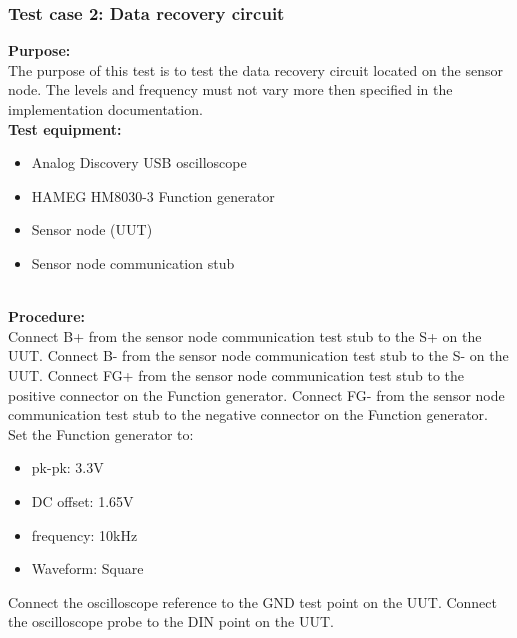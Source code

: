 \subsubsection{Test case 2: Data recovery circuit}
\textbf{Purpose:}\\
The purpose of this test is to test the data recovery circuit located on the sensor node.  The levels and frequency must not vary more then specified in the implementation documentation.\\

\textbf{Test equipment:}
\begin{itemize}
	\item Analog Discovery USB oscilloscope
	\item HAMEG HM8030-3 Function generator
	\item Sensor node (UUT)
	\item Sensor node communication stub
\end{itemize}
\ \\
\textbf{Procedure:}\\
Connect B+ from the sensor node communication test stub to the S+ on the UUT. Connect B- from the sensor node communication test stub to the S- on the UUT.
Connect FG+ from the sensor node communication test stub to the positive connector on the Function generator. Connect FG- from the sensor node communication test stub to the negative connector on the Function generator.\\ Set the Function generator to:
\begin{itemize}
	\item pk-pk: 3.3V
	\item DC offset: 1.65V
	\item frequency: 10kHz
	\item Waveform: Square
\end{itemize}
Connect the oscilloscope reference to the GND test point on the UUT.
Connect the oscilloscope probe to the DIN point on the UUT.\\
